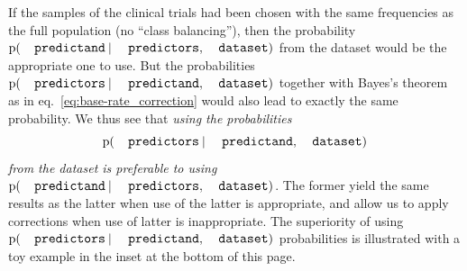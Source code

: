 \documentclass[utf8]{FrontiersinHarvard} %
\newcommand*{\eqn}{eq.}%
\newcommand*{\p}{\mathrm{p}}%
\renewcommand*{\|}[1][]{\nonscript\:#1\vert\nonscript\:\mathopen{}}
\begin{document}
If the samples of the clinical trials had been chosen with the same frequencies as the full population (no \enquote{class balancing}), then the probability $\p(\texttt{\small predictand} \| \texttt{\small predictors}, \texttt{\small dataset})$ from the dataset would be the appropriate one to use. But the probabilities $\p(\texttt{\small predictors} \| \texttt{\small predictand}, \texttt{\small dataset})$ together with Bayes's theorem as in \eqn~\eqref{eq:base-rate_correction} would also lead to exactly the same probability. We thus see that \emph{using the probabilities}
\[\p(\texttt{\small predictors} \| \texttt{\small predictand}, \texttt{\small dataset})\]
\emph{from the dataset is preferable to using} $\p(\texttt{\small predictand} \| \texttt{\small predictors}, \texttt{\small dataset})$. The former yield the same results as the latter when use of the latter is appropriate, and allow us to apply corrections when use of latter is inappropriate. The superiority of using $\p(\texttt{\small predictors} \| \texttt{\small predictand}, \texttt{\small dataset})$ probabilities is illustrated with a toy example in the inset at the bottom of this page.
\end{document}
